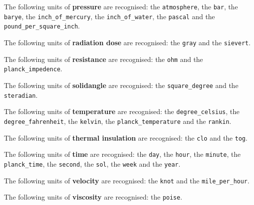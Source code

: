 {\noindent The following units of {\bf pressure} are recognised:\newline
\noindent the {\tt atmosphere}, the {\tt bar}, the {\tt barye}, the {\tt inch\_\-of\_\-mercury}, the {\tt inch\_\-of\_\-water}, the {\tt pascal} and the {\tt pound\_\-per\_\-square\_\-inch}.\vspace{5mm}

\noindent The following units of {\bf radiation dose} are recognised:\newline
\noindent the {\tt gray} and the {\tt sievert}.\vspace{5mm}

\noindent The following units of {\bf resistance} are recognised:\newline
\noindent the {\tt ohm} and the {\tt planck\_\-impedence}.\vspace{5mm}

\noindent The following units of {\bf solidangle} are recognised:\newline
\noindent the {\tt square\_\-degree} and the {\tt steradian}.\vspace{5mm}

\noindent The following units of {\bf temperature} are recognised:\newline
\noindent the {\tt degree\_\-celsius}, the {\tt degree\_\-fahrenheit}, the {\tt kelvin}, the {\tt planck\_\-temperature} and the {\tt rankin}.\vspace{5mm}

\noindent The following units of {\bf thermal insulation} are recognised:\newline
\noindent the {\tt clo} and the {\tt tog}.\vspace{5mm}

\noindent The following units of {\bf time} are recognised:\newline
\noindent the {\tt day}, the {\tt hour}, the {\tt minute}, the {\tt planck\_\-time}, the {\tt second}, the {\tt sol}, the {\tt week} and the {\tt year}.\vspace{5mm}

\noindent The following units of {\bf velocity} are recognised:\newline
\noindent the {\tt knot} and the {\tt mile\_\-per\_\-hour}.\vspace{5mm}

\noindent The following units of {\bf viscosity} are recognised:\newline
\noindent the {\tt poise}.\vspace{5mm}

}
